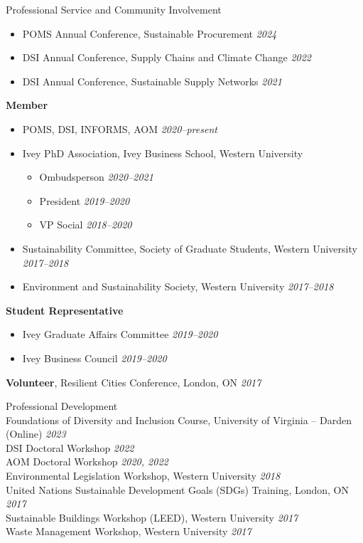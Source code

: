 \documentclass{resume} %
\begin{document}
\begin{rSection}{Professional Service and Community Involvement}
\begin{itemize}
    \item POMS Annual Conference, Sustainable Procurement \hfill {\em2024}
    \item DSI Annual Conference, Supply Chains and Climate Change	\hfill {\em2022}
    \item DSI Annual Conference, Sustainable Supply Networks	\hfill {\em2021}
\end{itemize}
\textbf{Member} 
\begin{itemize}
\item POMS, DSI, INFORMS, AOM \hfill {\em2020--present}
\item Ivey PhD Association, Ivey Business School, Western University
\begin{itemize}
\item [o] Ombudsperson	\hfill {\em2020--2021}
\item [o] President	\hfill {\em2019--2020}
\item [o] VP Social	\hfill {\em2018--2020}
\end{itemize}
\item Sustainability Committee, Society of Graduate Students, Western University	\hfill {\em2017--2018}
\item Environment and Sustainability Society, Western University	\hfill {\em2017--2018}
\end{itemize}

\textbf{Student Representative}
\begin{itemize}
\item Ivey Graduate Affairs Committee	\hfill {\em2019--2020}
\item Ivey Business Council	\hfill {\em2019--2020}
\end{itemize}
\textbf{Volunteer}, Resilient Cities Conference, London, ON	\hfill {\em2017}
\end{rSection}

\begin{rSection}{Professional Development} 
\ \\
Foundations of Diversity and Inclusion Course, University of Virginia -- Darden (Online)  \hfill {\em2023}\\
DSI Doctoral Workshop \hfill {\em2022}\\
AOM Doctoral Workshop	\hfill {\em2020, 2022}\\
Environmental Legislation Workshop, Western University	\hfill {\em2018}\\
United Nations Sustainable Development Goals (SDGs) Training, London, ON	\hfill {\em2017}\\
Sustainable Buildings Workshop (LEED), Western University	\hfill {\em2017}\\
Waste Management Workshop, Western University	\hfill {\em2017}
\end{rSection}
\end{document}
